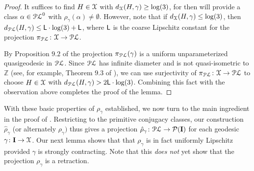 \documentclass[letterpaper,fleqn]{article}
\theoremstyle{plain}
\theoremstyle{definition}
\newcommand{\Z}{\mathbb{Z}}
\newcommand{\pl}{{\EuScript{PL}}} %
\newcommand{\os}{{\EuScript X}} %
\newcommand{\X}{\os}
\newcommand{\plproj}{\pi_\pl} %
\newcommand{\minlen}{m}  %
\newcommand{\minpts}{\rho} %
\newcommand{\mintime}{\hat{\minpts}} %
\newcommand{\lipconst}{{\sf L}} %
\newcommand{\I}{\mathbf{I}}
\begin{document}
\begin{proof}
It suffices to find $H \in \X$ with $d_{\X}(H,\gamma) \ge \log(3)$, for then  will provide a class $\alpha \in \pl^0$ with $\rho_\gamma(\alpha) \neq \emptyset$. However, note that if $d_\X(H,\gamma) \le \log(3)$, then $d_\pl(H, \gamma) \le \lipconst \cdot \log(3)+\lipconst$, where $\lipconst$ is the coarse Lipschitz constant for the projection $\pi_\pl\colon \X \to \pl$.

By Proposition $9.2$ of \cite{BFhyp} the projection $\pi_\pl(\gamma)$ is a uniform unparameterized quasigeodesic in $\pl$. Since $\pl$ has infinite diameter and is not quasi-isometric to $\Z$ (see, for example, Theorem $9.3$ of \cite{BFhyp}), we can use surjectivity of $\pi_\pl\colon \X\to\pl$ to choose $H \in \X$ with $d_\pl(H,\gamma) > 2\lipconst \cdot \log(3)$. Combining this fact with the observation above completes the proof of the lemma.
\end{proof}


With these basic properties of $\minpts_\gamma$ established, we now turn to the main ingredient in the proof of . Restricting to the primitive conjugacy classes, our construction $\mintime_\gamma$ (or alternately $\minpts_\gamma)$ thus gives a projection $\mintime_\gamma\colon \pl\to \mathcal{P}(\I)$ for each geodesic $\gamma\colon \I\to \os$. 
Our next lemma shows that that $\minpts_\gamma$ is in fact uniformly Lipschitz provided $\gamma$ is strongly contracting. 
Note that this \emph{does not} yet show that the projection $\rho_\gamma$ is a retraction.
\end{document}
